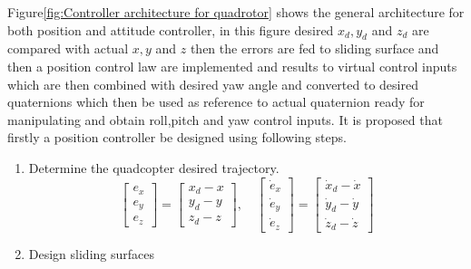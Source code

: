 \begin{small}
  Figure\ref{fig:Controller architecture for quadrotor} shows the general architecture for both position and attitude controller, in this figure desired $x_d,y_d $ and $z_d$ are compared with actual $x,y $ and $z$ then the errors are fed to sliding surface and then a position control law are implemented and results to virtual control inputs which are then combined with desired yaw angle and converted to desired quaternions which then be used as reference to actual quaternion ready for manipulating and obtain roll,pitch and yaw control inputs. It is proposed that firstly a position controller be designed using following steps.
\begin{enumerate}
  \item Determine the quadcopter desired trajectory.
  \begin{equation}
  \begin{bmatrix}
  e_x \\ e_y \\ e_z
  \end{bmatrix}
  =
  \begin{bmatrix}
  x_d - x \\ y_d - y \\ z_d - z
  \end{bmatrix},
  \quad
  \begin{bmatrix}
  \dot{e}_x \\ \dot{e}_y \\ \dot{e}_z
  \end{bmatrix}
  =
  \begin{bmatrix}
  \dot{x}_d - \dot{x} \\ \dot{y}_d - \dot{y} \\ \dot{z}_d - \dot{z}
  \end{bmatrix}
  \label{eqn:surface errors}
  \end{equation}


  \item Design sliding surfaces
  

\end{enumerate}
\end{small}

